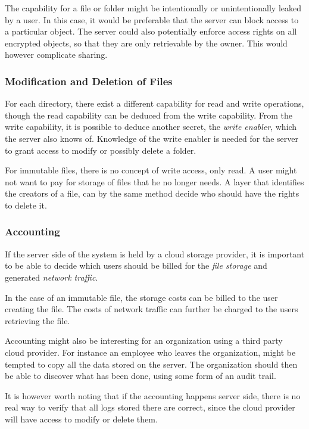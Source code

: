 \documentclass[pdftex,english,10pt,b5paper,twoside]{book}
\begin{document}
The capability for a file or folder might be intentionally or unintentionally
leaked by a user. In this case, it would be preferable that the server can
block access to a particular object. The server could also potentially enforce
access rights on all encrypted objects, so that they are only retrievable by
the owner. This would however complicate sharing.

\subsubsection{Modification and Deletion of Files}

For each directory, there exist a different capability for read and write
operations, though the read capability can be deduced from the write
capability. From the write capability, it is possible to deduce another secret,
the \emph{write enabler}, which the server also knows of.  Knowledge of the
write enabler is needed for the server to grant access to modify or possibly
delete a folder.

For immutable files, there is no concept of write access, only read. A user
might not want to pay for storage of files that he no longer needs.  A layer
that identifies the creators of a file, can by the same method decide who
should have the rights to delete it.

\subsubsection{Accounting}

If the server side of the system is held by a cloud storage provider, it is
important to be able to decide which users should be billed for the \emph{file
storage} and generated \emph{network traffic}.

In the case of an immutable file, the storage costs can be billed to the user
creating the file. The costs of network traffic can further be charged to the
users retrieving the file.

Accounting might also be interesting for an organization using a third party
cloud provider. For instance an employee who leaves the organization, might be
tempted to copy all the data stored on the server. The organization should then
be able to discover what has been done, using some form of an audit trail.

It is however worth noting that if the accounting happens server side, there is
no real way to verify that all logs stored there are correct, since the cloud
provider will have access to modify or delete them.
\end{document}
